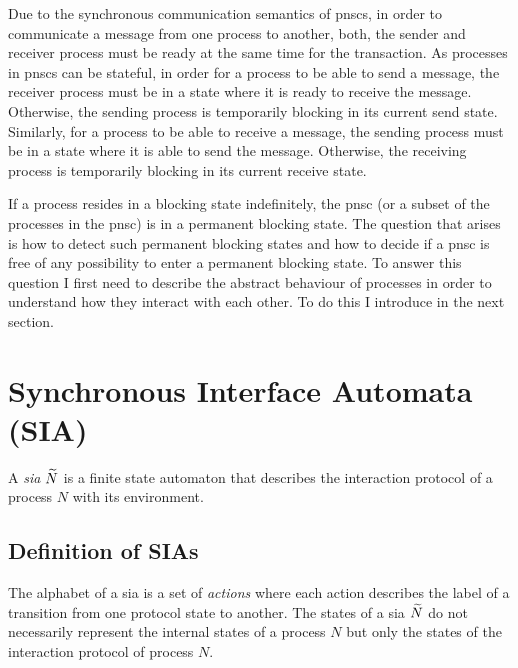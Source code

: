 
Due to the synchronous communication semantics of \glspl{pnsc}, in order to communicate a message from one process to another, both, the sender and receiver process must be ready at the same time for the transaction.
As processes in \glspl{pnsc} can be stateful, in order for a process to be able to send a message, the receiver process must be in a state where it is ready to receive the message.
Otherwise, the sending process is temporarily blocking in its current send state.
Similarly, for a process to be able to receive a message, the sending process must be in a state where it is able to send the message.
Otherwise, the receiving process is temporarily blocking in its current receive state.

If a process resides in a blocking state indefinitely, the \gls{pnsc} (or a subset of the processes in the \gls{pnsc}) is in a permanent blocking state.
The question that arises is how to detect such permanent blocking states and how to decide if a \gls{pnsc} is free of any possibility to enter a permanent blocking state.
To answer this question I first need to describe the abstract behaviour of processes in order to understand how they interact with each other.
To do this I introduce  in the next section.

\section{Synchronous Interface Automata (SIA)}
\label{sect_ecm_sia}

A \emph{\acrfull{sia}} $\widetilde{N}$ is a finite state automaton that describes the interaction protocol of a process $N$ with its environment.

\subsection{Definition of SIAs}
The alphabet of a \gls{sia} is a set of \emph{actions} where each action describes the label of a transition from one protocol state to another.
The states of a \gls{sia} $\widetilde{N}$ do not necessarily represent the internal states of a process $N$ but only the states of the interaction protocol of process $N$.

